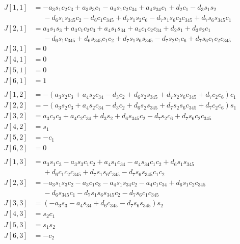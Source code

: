 \documentclass{article}
\begin{document}
\begin{align*}
J[1,1] &= - a_{3} s_{1} c_{2} c_{3} + a_{3} s_{3} c_{1} - a_{4} s_{1} c_{2} c_{34} + a_{4} s_{34} c_{1} + d_{2} c_{1} - d_{3} s_{1} s_{2} \\
       &\phantom{= }- d_{6} s_{1} s_{345} c_{2} - d_{6} c_{1} c_{345} + d_{7} s_{1} s_{2} c_{6} - d_{7} s_{1} s_{6} c_{2} c_{345} + d_{7} s_{6} s_{345} c_{1} \\
J[2,1] &= a_{3} s_{1} s_{3} + a_{3} c_{1} c_{2} c_{3} + a_{4} s_{1} s_{34} + a_{4} c_{1} c_{2} c_{34} + d_{2} s_{1} + d_{3} s_{2} c_{1} \\
       &\phantom{= }- d_{6} s_{1} c_{345} + d_{6} s_{345} c_{1} c_{2} + d_{7} s_{1} s_{6} s_{345} - d_{7} s_{2} c_{1} c_{6} + d_{7} s_{6} c_{1} c_{2} c_{345} \\
J[3,1] &= 0 \\
J[4,1] &= 0 \\
J[5,1] &= 0 \\
J[6,1] &= 1 \\
\\
J[1,2] &= - \left(a_{3} s_{2} c_{3} + a_{4} s_{2} c_{34} - d_{3} c_{2} + d_{6} s_{2} s_{345} + d_{7} s_{2} s_{6} c_{345} + d_{7} c_{2} c_{6}\right) c_{1} \\
J[2,2] &= - \left(a_{3} s_{2} c_{3} + a_{4} s_{2} c_{34} - d_{3} c_{2} + d_{6} s_{2} s_{345} + d_{7} s_{2} s_{6} c_{345} + d_{7} c_{2} c_{6}\right) s_{1} \\
J[3,2] &= a_{3} c_{2} c_{3} + a_{4} c_{2} c_{34} + d_{3} s_{2} + d_{6} s_{345} c_{2} - d_{7} s_{2} c_{6} + d_{7} s_{6} c_{2} c_{345} \\
J[4,2] &= s_{1} \\
J[5,2] &= - c_{1} \\
J[6,2] &= 0 \\
\\
J[1,3] &= a_{3} s_{1} c_{3} - a_{3} s_{3} c_{1} c_{2} + a_{4} s_{1} c_{34} - a_{4} s_{34} c_{1} c_{2} + d_{6} s_{1} s_{345} \\
       &\phantom{= }+ d_{6} c_{1} c_{2} c_{345} + d_{7} s_{1} s_{6} c_{345} - d_{7} s_{6} s_{345} c_{1} c_{2} \\
J[2,3] &= - a_{3} s_{1} s_{3} c_{2} - a_{3} c_{1} c_{3} - a_{4} s_{1} s_{34} c_{2} - a_{4} c_{1} c_{34} + d_{6} s_{1} c_{2} c_{345} \\
       &\phantom{= }- d_{6} s_{345} c_{1} - d_{7} s_{1} s_{6} s_{345} c_{2} - d_{7} s_{6} c_{1} c_{345} \\
J[3,3] &= \left(- a_{3} s_{3} - a_{4} s_{34} + d_{6} c_{345} - d_{7} s_{6} s_{345}\right) s_{2} \\
J[4,3] &= s_{2} c_{1} \\
J[5,3] &= s_{1} s_{2} \\
J[6,3] &= - c_{2} \\
\end{align*}
\end{document}
